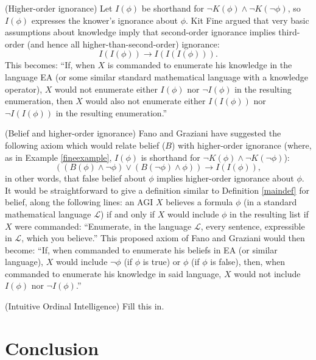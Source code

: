 \documentclass[runningheads]{llncs}
\begin{document}
\begin{example}
\label{fineexample}
  (Higher-order ignorance) Let $I(\phi)$ be shorthand for
  $\neg K(\phi)\wedge \neg K(\neg\phi)$, so $I(\phi)$ expresses the knower's
  ignorance about $\phi$. Kit Fine argued \cite{fine2018ignorance} that very
  basic assumptions
  about knowledge imply that second-order ignorance implies third-order (and hence
  all higher-than-second-order) ignorance:
  \[
    I(I(\phi)) \rightarrow I(I(I(\phi))).
  \]
  This becomes: ``If, when $X$ is commanded to enumerate his knowledge in the
  language EA (or some similar standard mathematical language with a knowledge
  operator), $X$ would not enumerate either $I(\phi)$ nor $\neg I(\phi)$ in
  the resulting enumeration, then $X$ would also not enumerate either $I(I(\phi))$
  nor $\neg I(I(\phi))$ in the resulting enumeration.''
\end{example}

\begin{example}
  (Belief and higher-order ignorance) Fano and Graziani have suggested \cite{fano} the
  following axiom which would relate belief ($B$) with higher-order ignorance
  (where, as in Example \ref{fineexample}, $I(\phi)$ is shorthand for
  $\neg K(\phi)\wedge \neg K(\neg\phi)$):
  \[
    ((B(\phi) \wedge \neg\phi)\vee (B(\neg\phi)\wedge \phi)) \rightarrow I(I(\phi)),
  \]
  in other words, that false belief about $\phi$ implies higher-order ignorance
  about $\phi$. It would be straightforward to give a definition similar to
  Definition \ref{maindef} for belief, along the following lines: an AGI $X$
  believes a formula $\phi$ (in a standard mathematical language $\mathscr L$)
  if and only if $X$ would include $\phi$ in the resulting list if $X$ were
  commanded:
    ``Enumerate, in the language $\mathscr L$, every sentence,
  expressible in $\mathscr L$, which you believe.''
  This proposed axiom of Fano and Graziani would then become:
  ``If, when commanded to enumerate his beliefs in EA (or similar language),
  $X$ would include $\neg\phi$ (if $\phi$ is true) or $\phi$ (if $\phi$ is false),
  then, when commanded to enumerate his knowledge in said language,
  $X$ would not include $I(\phi)$ nor $\neg I(\phi)$.''
\end{example}

\begin{example}
  (Intuitive Ordinal Intelligence) Fill this in.
\end{example}

\section{Conclusion}
\label{conclusionsection}
\end{document}
